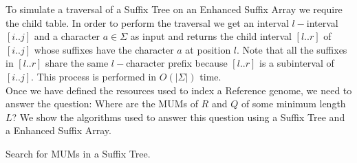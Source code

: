 \documentclass{acm_proc_article-sp}
\begin{document}
To simulate a traversal of a Suffix Tree on an Enhanced Suffix Array we require the child table. In order to perform the traversal we get an interval $l-$interval $[i..j]$ and a character $a\in \Sigma$ as input and returns the child interval $[l..r]$ of $[i..j]$ whose suffixes have the character $a$ at position $l$. Note that all the suffixes in $[l..r]$ share the same $l-$character prefix because $[l..r]$ is a subinterval of $[i..j]$. This process is performed in $O(|\Sigma|)$ time.\\
Once we have defined the resources used to index a Reference genome, we need to answer the question: Where are the MUMs of $R$ and $Q$ of some minimum length $L$? We show the algorithms used to answer this question using a Suffix Tree and a Enhanced Suffix Array.
\linesnumbered
\begin{algorithm}
  \dontprintsemicolon
  \Input{\R, \Q, \Len}
  \caption{Search for MUMs in a Suffix Tree.}
\end{algorithm}
\linesnumbered
\end{document}
